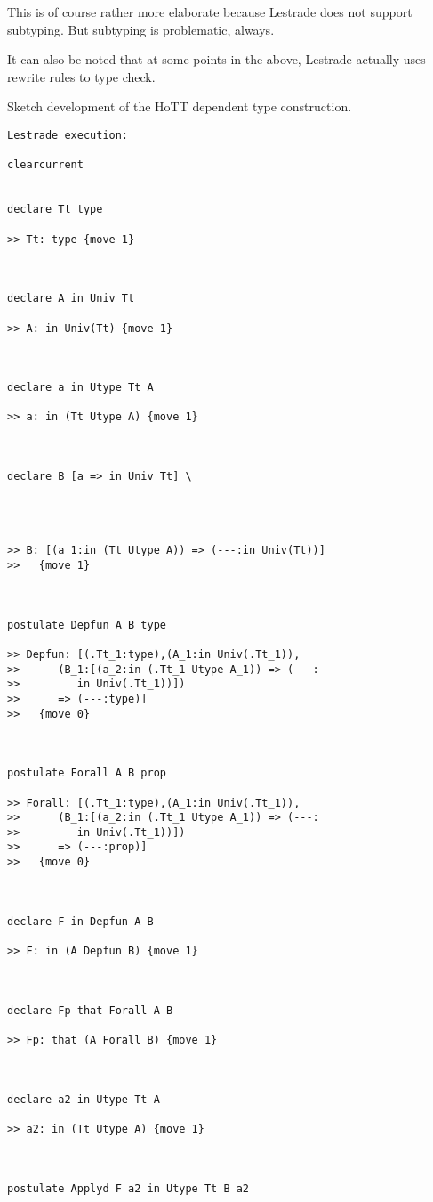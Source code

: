 \documentclass{article}
\begin{document}
This is of course rather more elaborate because Lestrade does not support subtyping.  But subtyping is problematic, always.

It can also be noted that at some points in the above, Lestrade actually uses rewrite rules to type check.

Sketch development of the HoTT dependent type construction.

\begin{verbatim}Lestrade execution:

clearcurrent


declare Tt type

>> Tt: type {move 1}



declare A in Univ Tt

>> A: in Univ(Tt) {move 1}



declare a in Utype Tt A

>> a: in (Tt Utype A) {move 1}



declare B [a => in Univ Tt] \
   



>> B: [(a_1:in (Tt Utype A)) => (---:in Univ(Tt))]
>>   {move 1}



postulate Depfun A B type

>> Depfun: [(.Tt_1:type),(A_1:in Univ(.Tt_1)),
>>      (B_1:[(a_2:in (.Tt_1 Utype A_1)) => (---:
>>         in Univ(.Tt_1))])
>>      => (---:type)]
>>   {move 0}



postulate Forall A B prop

>> Forall: [(.Tt_1:type),(A_1:in Univ(.Tt_1)),
>>      (B_1:[(a_2:in (.Tt_1 Utype A_1)) => (---:
>>         in Univ(.Tt_1))])
>>      => (---:prop)]
>>   {move 0}



declare F in Depfun A B

>> F: in (A Depfun B) {move 1}



declare Fp that Forall A B

>> Fp: that (A Forall B) {move 1}



declare a2 in Utype Tt A

>> a2: in (Tt Utype A) {move 1}



postulate Applyd F a2 in Utype Tt B a2


\end{verbatim}
\end{document}
